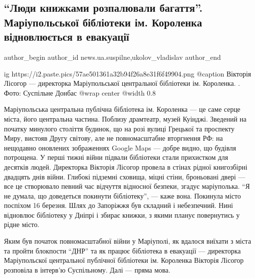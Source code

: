  
 
 
 
 
 
\subsection{\enquote{Люди книжками розпалювали багаття}. Маріупольської бібліотеки ім. Короленка відновлюється в евакуації}
\label{sec:06_05_2023.stz.news.ua.suspilne.1.ludi_knizhki_bagattja}
 
\ifcmt
 author_begin
   author_id news.ua.suspilne,ukolov_vladislav
 author_end
\fi

\ifcmt
	ig https://i2.paste.pics/57ae501361a32b94f26a8e31f6f49904.png
  @caption Вікторія Лісогор — директорка Маріупольської центральної бібліотеки ім. Короленка. . Фото: Суспільне Донбас
  @wrap center
  @width 0.8
\fi

\begin{qqquote}
Маріупольська центральна публічна бібліотека ім. Короленка — це саме серце
міста, його центральна частина. Поблизу драмтеатр, музей Куінджі. Зведений на
початку минулого століття будинок, що на розі вулиці Грецької та проспекту
Миру, вистояв Другу світову, але не повномасштабне вторгнення РФ: на нещодавно
оновлених зображеннях Google Maps — добре видно, що будівля потрощена. У перші
тижні війни підвали бібліотеки стали прихистком для десятків людей. Директорка
Вікторія Лісогор провела в стінах рідної книгозбірні двадцять днів війни.
Глибокі підземні сховища, міцні стіни, броньовані двері — все це створювало
певний час відчуття відносної безпеки, згадує маріуполька. \enquote{Я не думала, що
доведеться покинути бібліотеку}, — каже вона. Покинула місто поспіхом 16
березня. Шлях до Запоріжжя був складний і небезпечний. Нині відновлює
бібліотеку у Дніпрі і збирає книжки, з якими планує повернутись у рідне місто.

Яким був початок повномасштабної війни у Маріуполі, як вдалося виїхати з міста
та пройти блокпости \enquote{ДНР} та як працює бібліотека в евакуації — директорка
Маріупольскої центральної публічної бібліотеки ім. Короленка Вікторія Лісогор
розповіла в інтерв'ю Суспільному. Далі — пряма мова. 
	
\end{qqquote}

